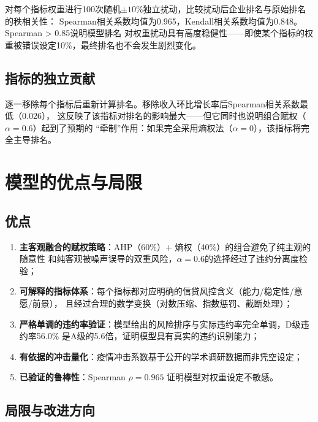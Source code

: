 \documentclass[12pt,a4paper]{ctexart}
\begin{document}
对每个指标权重进行100次随机$\pm 10\%$独立扰动，比较扰动后企业排名与原始排名的秩相关性：
Spearman相关系数均值为0.965，Kendall相关系数均值为0.848。Spearman > 0.85说明模型排名
对权重扰动具有高度稳健性——即使某个指标的权重被错误设定10\%，最终排名也不会发生剧烈变化。

\subsection{指标的独立贡献}

逐一移除每个指标后重新计算排名。移除收入环比增长率后Spearman相关系数最低（0.026），
这反映了该指标对排名的影响最大——但它同时也说明组合赋权（$\alpha=0.6$）起到了预期的
``牵制''作用：如果完全采用熵权法（$\alpha=0$），该指标将完全主导排名。

\section{模型的优点与局限}

\subsection{优点}

\begin{enumerate}
    \item \textbf{主客观融合的赋权策略}：AHP（60\%）+ 熵权（40\%）的组合避免了纯主观的随意性
          和纯客观被噪声误导的双重风险，$\alpha=0.6$的选择经过了违约分离度检验；
    \item \textbf{可解释的指标体系}：每个指标都对应明确的信贷风控含义（能力/稳定性/意愿/前景），
          且经过合理的数学变换（对数压缩、指数惩罚、截断处理）；
    \item \textbf{严格单调的违约率验证}：模型给出的风险排序与实际违约率完全单调，D级违约率56.0\%
          是A级的5.6倍，证明模型具有真实的违约识别能力；
    \item \textbf{有依据的冲击量化}：疫情冲击系数基于公开的学术调研数据而非凭空设定；
    \item \textbf{已验证的鲁棒性}：Spearman $\rho=0.965$ 证明模型对权重设定不敏感。
\end{enumerate}

\subsection{局限与改进方向}
\end{document}
